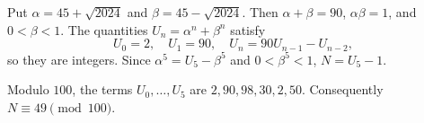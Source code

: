 Put $\alpha=45+\sqrt{2024}$ and $\beta=45-\sqrt{2024}$. Then $\alpha+\beta=90$, $\alpha\beta=1$, and $0<\beta<1$. The quantities $U_n=\alpha^n+\beta^n$ satisfy
\[
U_0=2,\quad U_1=90,\quad U_n=90U_{n-1}-U_{n-2},
\]
so they are integers. Since $\alpha^5=U_5-\beta^5$ and $0<\beta^5<1$, $N=U_5-1$.

Modulo $100$, the terms $U_0,\ldots,U_5$ are $2,90,98,30,2,50$. Consequently $\boxed{N\equiv49\pmod{100}}$.
